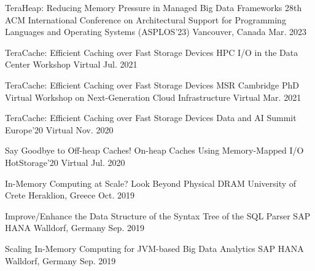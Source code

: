 

\begin{cvhonors}
  \cvhonor
    {TeraHeap: Reducing Memory Pressure in Managed Big Data Frameworks} %
    {28th ACM International Conference on Architectural Support for Programming
    Languages and Operating Systems (ASPLOS'23)} %
    {Vancouver, Canada} %
    {Mar. 2023} %

  \cvhonor
    {TeraCache: Efficient Caching over Fast Storage Devices} %
    {HPC I/O in the Data Center Workshop} %
    {Virtual} %
    {Jul. 2021} %

  \cvhonor
    {TeraCache: Efficient Caching over Fast Storage Devices} %
    {MSR Cambridge PhD Virtual Workshop on Next-Generation Cloud Infrastructure} %
    {Virtual} %
    {Mar. 2021} %

  \cvhonor
    {TeraCache: Efficient Caching over Fast Storage Devices} %
    {Data and AI Summit Europe'20} %
    {Virtual} %
    {Nov. 2020} %

  \cvhonor
    {Say Goodbye to Off-heap Caches! On-heap Caches Using Memory-Mapped I/O} %
    {HotStorage'20} %
    {Virtual} %
    {Jul. 2020} %

  \cvhonor
    {In-Memory Computing at Scale? Look Beyond Physical DRAM} %
    {University of Crete} %
    {Heraklion, Greece} %
    {Oct. 2019} %

  \cvhonor
    {Improve/Enhance the Data Structure of the Syntax Tree of the SQL Parser} %
    {SAP HANA} %
    {Walldorf, Germany} %
    {Sep. 2019} %


  \cvhonor
    {Scaling In-Memory Computing for JVM-based Big Data Analytics} %
    {SAP HANA} %
    {Walldorf, Germany} %
    {Sep. 2019} %


\end{cvhonors}
